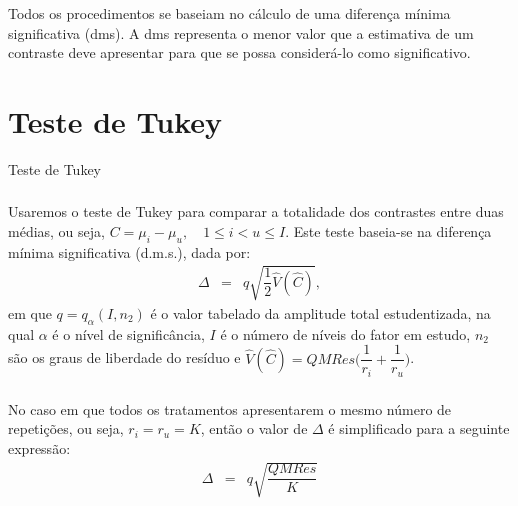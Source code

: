 \documentclass[14pt,aspectratio=1610]{beamer}
\begin{document}
\begin{frame}{}
\frametitle{}
\begin{block}{}
\justifying
Todos os procedimentos se baseiam no cálculo de uma diferença mínima
significativa (dms). A dms representa o menor valor que a estimativa de um contraste deve apresentar para que se possa considerá-lo como significativo.
\end{block}
\end{frame}

\section{Teste de Tukey}
\begin{frame}{Teste de Tukey}
\frametitle{}
\begin{block}{}
\justifying
Usaremos o teste de Tukey para comparar a totalidade dos contrastes entre duas médias, ou seja, $C = \mu_i - \mu_u,\quad 1\leq i< u\leq I$. Este teste baseia-se na diferença mínima significativa (d.m.s.), dada por:
\begin{eqnarray*}
  \Delta &=& q\sqrt{\dfrac{1}{2}\hat{V}(\hat{C})},
\end{eqnarray*}
em que $q = q_{\alpha}(I, n_2)$ é o valor tabelado da amplitude total estudentizada, na qual $\alpha$ é o nível de significância, $I$ é o número de níveis do fator em estudo, $n_2$ são os graus de liberdade do resíduo e $\hat{V}(\hat{C}) = QMRes\bigg(\dfrac{1}{r_i} + \dfrac{1}{r_u}\bigg)$.
\end{block}
\end{frame}

\begin{frame}{}
\frametitle{}
\begin{block}{}
\justifying
No caso em que todos os tratamentos apresentarem o mesmo número de 
repetições, ou seja, $r_i = r_u = K$, então o valor de $\Delta$ é 
simplificado para a seguinte expressão:
\begin{eqnarray*}
  \Delta &=& q\sqrt{\dfrac{QMRes}{K}}
\end{eqnarray*}
\end{block}
\end{frame}
\end{document}
